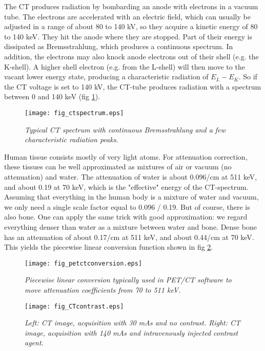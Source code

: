 The CT produces radiation by bombarding an anode with electrons in a vacuum
tube. The electrons are accelerated with an electric field, which can usually
be adjusted in a range of about 80 to 140 kV, so they acquire a kinetic energy
of 80 to 140 keV. They hit the anode where they are stopped. Part of their
energy is dissipated as Bremsstrahlung, which produces a continuous spectrum.
In addition, the electrons may also knock anode electrons out of their shell
(e.g. the K-shell). A higher shell electron (e.g. from the L-shell) will then
move to the vacant lower energy state, producing a characteristic radiation of
$E_L - E_K$. So if the CT voltage is set to 140 kV, the CT-tube produces
radiation with a spectrum between 0 and 140 keV (fig \ref{fig:ctspectrum}).
%
\begin{figure}[tbp]
\centering
\texttt{[image: fig\_ctspectrum.eps]}
\caption{\label{fig:ctspectrum} \emph{Typical CT spectrum with continuous
Bremsstrahlung and a few characteristic radiation peaks.}}
\end{figure}

Human tissue consists mostly of very light atoms. For attenuation
correction, these tissues can be well approximated as mixtures of air
or vacuum (no attenuation) and water. The attenuation of water is
about 0.096/cm at 511 keV, and about 0.19 at 70 keV, which is the
"effective" energy of the CT-spectrum. Assuming that everything in the
human body is a mixture of water and vacuum, we only need a single
scale factor equal to 0.096 / 0.19. But of course, there is also bone.
One can apply the same trick with good approximation: we regard
everything denser than water as a mixture between water and
bone. Dense bone has an attenuation of about 0.17/cm at 511 keV, and
about 0.44/cm at 70 keV. This yields the piecewise linear conversion
function shown in fig \ref{fig:petctconversion}.
%
\begin{figure}[tbp]
\centering
\texttt{[image: fig\_petctconversion.eps]}
\caption{\label{fig:petctconversion} \emph{Piecewise linear conversion
typically used in PET/CT software to move attenuation coefficients
from 70 to 511 keV.}}
\end{figure}

\begin{figure}[tbp]
\centering
\texttt{[image: fig\_CTcontrast.eps]}
\caption{\label{fig:CTcontrast} \emph{Left: CT image, acquisition with
    30 mAs and no contrast. Right: CT image, acquisition with 140 mAs
    and intravenously injected contrast agent.}}
\end{figure}

